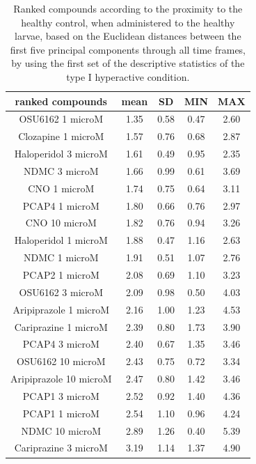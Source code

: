 \documentclass[a4paper,12pt]{article}
\begin{document}
\begin{table}[h!]\tiny
\centering
\caption{Ranked compounds according to the proximity to the healthy control, when administered to the healthy larvae, based on the Euclidean distances between the first five principal components through all time frames, by using the first set of the descriptive statistics of the type I hyperactive condition.}
\begin{tabular}{|c|c|c|c|c|}
\hline
ranked compounds             & mean & SD   & MIN  & MAX   \\ \hline
OSU6162 1 microM       & 1.35 & 0.58 & 0.47 & 2.60   \\ \hline
Clozapine 1 microM     & 1.57 & 0.76 & 0.68 & 2.87  \\ \hline
Haloperidol 3 microM   & 1.61 & 0.49 & 0.95 & 2.35  \\ \hline
NDMC 3 microM          & 1.66 & 0.99 & 0.61 & 3.69  \\ \hline
CNO 1 microM           & 1.74 & 0.75 & 0.64 & 3.11  \\ \hline
PCAP4 1 microM       & 1.80  & 0.66 & 0.76 & 2.97  \\ \hline
CNO 10 microM          & 1.82 & 0.76 & 0.94 & 3.26  \\ \hline
Haloperidol 1 microM   & 1.88 & 0.47 & 1.16 & 2.63  \\ \hline
NDMC 1 microM          & 1.91 & 0.51 & 1.07 & 2.76  \\ \hline
PCAP2 1 microM         & 2.08 & 0.69 & 1.10  & 3.23  \\ \hline
OSU6162 3 microM       & 2.09 & 0.98 & 0.50  & 4.03  \\ \hline
Aripiprazole 1 microM  & 2.16 & 1.00    & 1.23 & 4.53  \\ \hline
Cariprazine 1 microM   & 2.39 & 0.80  & 1.73 & 3.90   \\ \hline
PCAP4 3 microM       & 2.40  & 0.67 & 1.35 & 3.46  \\ \hline
OSU6162 10 microM      & 2.43 & 0.75 & 0.72 & 3.34  \\ \hline
Aripiprazole 10 microM & 2.47 & 0.80  & 1.42 & 3.46  \\ \hline
PCAP1 3 microM         & 2.52 & 0.92 & 1.40  & 4.36  \\ \hline
PCAP1 1 microM         & 2.54 & 1.10  & 0.96 & 4.24  \\ \hline
NDMC 10 microM         & 2.89 & 1.26 & 0.40  & 5.39  \\ \hline
Cariprazine 3 microM   & 3.19 & 1.14 & 1.37 & 4.90   \\ \hline

\end{tabular}
\end{table}
\end{document}
